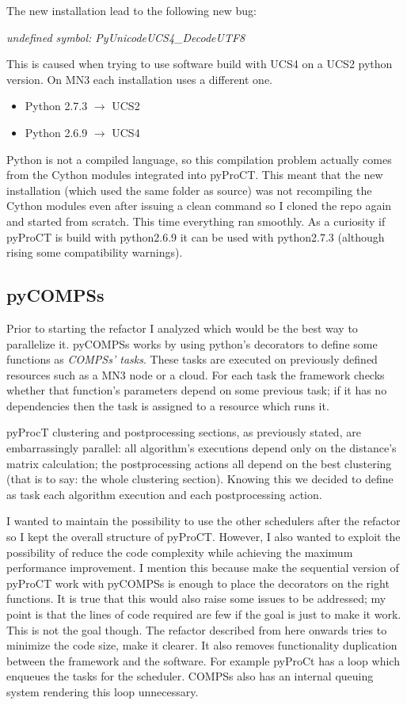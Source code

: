 The new installation lead to the following new bug: 

\textit{undefined symbol: PyUnicodeUCS4\_DecodeUTF8}

This is caused when trying to use software build with UCS4 on a UCS2 python version. On MN3 each installation uses a different one.

\begin{itemize}
\itemsep0em 
\item Python 2.7.3 $\rightarrow$ UCS2
\item Python 2.6.9 $\rightarrow$ UCS4
\end{itemize}

Python is not a compiled language, so this compilation problem actually comes from the Cython modules integrated into pyProCT. This meant that the new installation (which used the same folder as source) was not recompiling the Cython modules even after issuing a clean command so I cloned the repo again and started from scratch. This time everything ran smoothly. As a curiosity if pyProCT is build with python2.6.9 it can be used with python2.7.3 (although rising some compatibility warnings).

\subsection{pyCOMPSs}
\label{subsec:pycompss}

Prior to starting the refactor I analyzed which would be the best way to parallelize it. pyCOMPSs works by using python's decorators to define some functions as \textit{COMPSs' tasks}. These tasks are executed on previously defined resources such as a MN3 node or a cloud. For each task the framework checks whether that function's parameters depend on some previous task; if it has no dependencies then the task is assigned to a resource which runs it. 

pyProcT clustering and postprocessing sections, as previously stated, are embarrassingly parallel: all algorithm's executions depend only on the distance's matrix calculation; the postprocessing actions all depend on the best clustering (that is to say: the whole clustering section). Knowing this we decided to define as task each algorithm execution and each postprocessing action.

I wanted to maintain the possibility to use the other schedulers after the refactor so I kept the overall structure of pyProCT. However, I also wanted to exploit the possibility of reduce the code complexity while achieving the maximum performance improvement. I mention this because make the sequential version of pyProCT work with pyCOMPSs is enough to place the decorators on the right functions. It is true that this would also raise some issues to be addressed; my point is that the lines of code required are few if the goal is just to make it work. This is not the goal though. The refactor described from here onwards tries to minimize the code size, make it clearer. It also removes functionality duplication between the framework and the software. For example pyProCt has a loop which enqueues the tasks for the scheduler. COMPSs also has an internal queuing system rendering this loop unnecessary.

